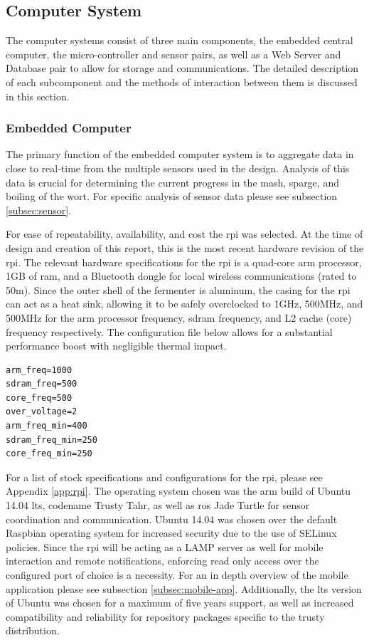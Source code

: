 \documentclass{article}
\begin{document}
\subsection{Computer System}
The computer systems consist of three main components, the embedded central computer, the micro-controller and sensor pairs, as well as a Web Server and Database pair to allow for storage and communications.  The detailed description of each subcomponent and the methods of interaction between them is discussed in this section.
\subsubsection{Embedded Computer}
The primary function of the embedded computer system is to aggregate data in close to real-time from the multiple sensors used in the design.  Analysis of this data is crucial for determining the current progress in the \gls{mash}, \gls{sparge}, and boiling of the \gls{wort}.  For specific analysis of sensor data please see subsection \ref{subsec:sensor}.

For ease of repeatability, availability, and cost the \gls{rpi} was selected.  At the time of design and creation of this report, this is the most recent hardware revision of the \gls{rpi}.  The relevant hardware specifications for the \gls{rpi} is a quad-core \gls{arm} processor, 1GB of \gls{ram}, and a Bluetooth dongle for local wireless communications (rated to 50m).  Since the outer shell of the fermenter is aluminum, the casing for the \gls{rpi} can act as a heat sink, allowing it to be safely overclocked to 1GHz, 500MHz, and 500MHz for the \gls{arm} processor frequency, sdram frequency, and L2 cache (core) frequency respectively.  The configuration file below allows for a substantial performance boost with negligible thermal impact.  

\begin{lstlisting}
arm_freq=1000
sdram_freq=500
core_freq=500
over_voltage=2
arm_freq_min=400
sdram_freq_min=250
core_freq_min=250
\end{lstlisting}

For a list of stock specifications and configurations for the \gls{rpi}, please see Appendix \ref{app:rpi}.  The operating system chosen was the \gls{arm} build of Ubuntu 14.04 \gls{lts}, codename Trusty Tahr, as well as \gls{ros} Jade Turtle for sensor coordination and communication.  Ubuntu 14.04 was chosen over the default Raspbian operating system for increased security due to the use of SELinux policies.  Since the \gls{rpi} will be acting as a LAMP server as well for mobile interaction and remote notifications, enforcing read only access over the configured port of choice is a necessity. For an in depth overview of the mobile application please see subsection \ref{subsec:mobile-app}.  Additionally, the \gls{lts} version of Ubuntu was chosen for a maximum of five years support, as well as increased compatibility and reliability for repository packages specific to the trusty distribution.
\end{document}
